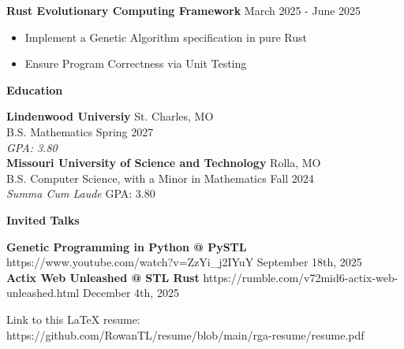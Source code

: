 \documentclass[11pt]{article}
\begin{document}
\textbf{Rust Evolutionary Computing Framework} \hfill March 2025 - June 2025
\begin{itemize}[noitemsep, topsep=0pt, partopsep=0pt, parsep=0pt, itemsep=0pt]
    \item Implement a Genetic Algorithm specification in pure Rust
    \item Ensure Program Correctness via Unit Testing
\end{itemize}

\begin{center}
    \textbf{Education}
\end{center}
\textbf{Lindenwood Universiy} \hfill St. Charles, MO \\
B.S. Mathematics \hfill Spring 2027 \\
\textit{GPA: 3.80}\\

\textbf{Missouri University of Science and Technology} \hfill Rolla, MO \\
B.S. Computer Science, with a Minor in Mathematics \hfill Fall 2024  \\
\textit{Summa Cum Laude} \hfill GPA: 3.80

\begin{center}
    \textbf{Invited Talks}
\end{center}

\textbf{Genetic Programming in Python @ PySTL} \tiny{https://www.youtube.com/watch?v=ZzYi\_j2IYuY} \hfill \normalsize{September 18th, 2025} \\
\textbf{Actix Web Unleashed @ STL Rust} \tiny{https://rumble.com/v72mid6-actix-web-unleashed.html} \hfill \normalsize{December 4th, 2025}

\begin{center}
    \tiny{Link to this LaTeX resume: https://github.com/RowanTL/resume/blob/main/rga-resume/resume.pdf}
\end{center}
\end{document}
